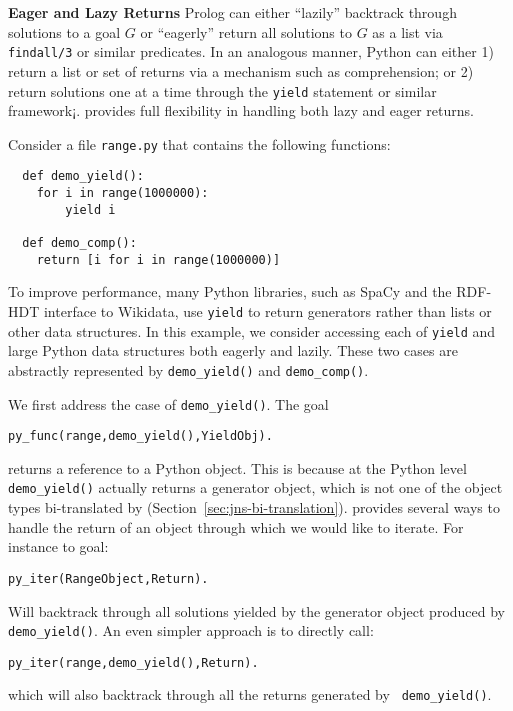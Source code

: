 \begin{example} \rm {\bf Eager and Lazy Returns} \label{jns-examp:lazy-ret}
\noindent
  Prolog can either ``lazily'' backtrack through solutions to a goal
  $G$ or ``eagerly'' return all solutions to $G$ as a list via {\tt
    findall/3} or similar predicates.  In an analogous manner, Python
  can either 1) return a list or set of returns via a mechanism such
  as comprehension; or 2) return solutions one at a time through the
  {\tt yield} statement or similar framework¡.  \janus{} provides full
  flexibility in handling both lazy and eager returns.

  Consider a file {\tt range.py} that contains the following functions:
\begin{verbatim}
  def demo_yield(): 
    for i in range(1000000):
        yield i

  def demo_comp():
    return [i for i in range(1000000)]
\end{verbatim}
%
To improve performance, many Python libraries, such as SpaCy and the
RDF-HDT interface to Wikidata, use {\tt yield} to return generators
rather than lists or other data structures.  In this example, we
consider accessing each of {\tt yield} and large Python data
structures both eagerly and lazily.  These two cases are abstractly
represented by {\tt demo\_yield()} and {\tt demo\_comp()}.

We first address the case of {\tt demo\_yield()}.  The goal 

{\tt py\_func(range,demo\_yield(),YieldObj).}

\noindent
returns a reference to a Python object.  This is because at the Python
level {\tt demo\_yield()} actually returns a generator object, which
is not one of the object types bi-translated by \janus{}
(Section~\ref{sec:jns-bi-translation}).  \janus{} provides several ways
to handle the return of an object through which we would like to
iterate.  For instance to goal:

{\tt py\_iter(RangeObject,Return).}

Will backtrack through all solutions yielded by the generator object
produced by {\tt demo\_yield()}.  An even simpler approach is to
directly call:

{\tt py\_iter(range,demo\_yield(),Return).}

\noindent
which will also backtrack through all the returns generated by {\tt
  demo\_yield()}.

%
%


\end{example}
